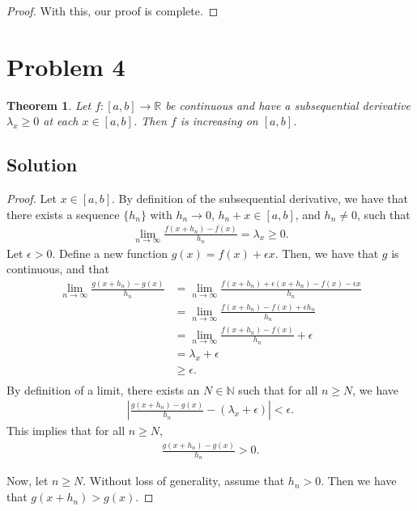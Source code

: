 \documentclass[10pt,a4paper]{article}
\theoremstyle{theorem}
\newtheorem{theorem}{Theorem}
\theoremstyle{definition}
\begin{document}
\begin{proof}
With this, our proof is complete.
\end{proof}

\section*{Problem 4}
\begin{theorem}
Let $f:[a, b] \to \mathbb{R}$ be continuous and have a subsequential derivative $\lambda_x \geq 0$ at each $x \in [a,b]$. Then $f$ is increasing on $[a, b]$.
\end{theorem}

\subsection*{Solution}
\begin{proof}
Let $x \in [a, b]$. By definition of the subsequential derivative, we have that there exists a sequence $\{h_n\}$ with $h_n \to 0$, $h_n + x \in [a, b]$, and $h_n \not = 0$, such that
\begin{align*}
\lim_{n \to \infty} \frac{f(x + h_n) - f(x)}{h_n} = \lambda_x \geq 0.
\end{align*}
Let $\epsilon > 0$. Define a new function $g(x) = f(x) + \epsilon x$. Then, we have that $g$ is continuous, and that 
\begin{align*}
\lim_{n \to \infty} \frac{g(x + h_n) - g(x)}{h_n} &= \lim_{n \to \infty} \frac{f(x + h_n) + \epsilon(x+h_n) - f(x) - \epsilon x}{h_n}\\
&= \lim_{n \to \infty} \frac{f(x + h_n) - f(x) + \epsilon h_n}{h_n}\\
&= \lim_{n \to \infty} \frac{f(x + h_n) - f(x)}{h_n} + \epsilon\\
&= \lambda_x + \epsilon\\
&\geq \epsilon.\\
\end{align*}
By definition of a limit, there exists an $N \in \mathbb{N}$ such that for all $n \geq N$, we have
\begin{align*}
\left| \frac{g(x + h_n) - g(x)}{h_n} - (\lambda_x + \epsilon)\right| < \epsilon.
\end{align*}
This implies that for all $n \geq N$, 
\begin{align*}
\frac{g(x + h_n) - g(x)}{h_n} > 0.
\end{align*}

Now, let $n \geq N$. Without loss of generality, assume that $h_n > 0$. Then we have that $g(x + h_n) > g(x)$.
\end{proof}
\end{document}

